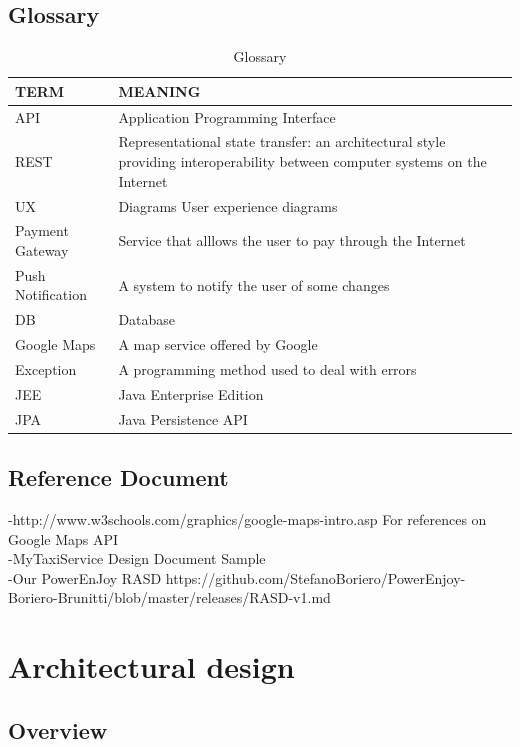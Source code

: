 \documentclass{article}
\begin{document}
\subsection{Glossary}
\begin{table}[H]
\centering
\caption{Glossary}
\label{my-label}
\begin{tabular}{|l|p{8cm}|}
\hline

TERM & MEANING\\
\hline


API & Application Programming Interface\\\hline
REST &  Representational state transfer: an architectural style providing interoperability between computer systems on the Internet  \\ \hline
UX & Diagrams User experience diagrams  \\ \hline
Payment Gateway & Service that alllows the user to pay through the Internet \\ \hline
Push Notification & A system to notify the user of some changes \\ \hline
DB & Database\\ \hline
Google Maps & A map service offered by Google \\ \hline
Exception & A programming method used to deal with errors \\ \hline
JEE & Java Enterprise Edition \\ \hline
JPA & Java Persistence API \\ \hline
\end{tabular}
\end{table}
\subsection{Reference Document}
-http://www.w3schools.com/graphics/google-maps-intro.asp For references on Google Maps API  \\
-MyTaxiService Design Document Sample \\
-Our PowerEnJoy RASD https://github.com/StefanoBoriero/PowerEnjoy-Boriero-Brunitti/blob/master/releases/RASD-v1.md
\newpage
\section{Architectural design}
\subsection{Overview}
\begin{figure}[ht]
\end{figure}
\end{document}
